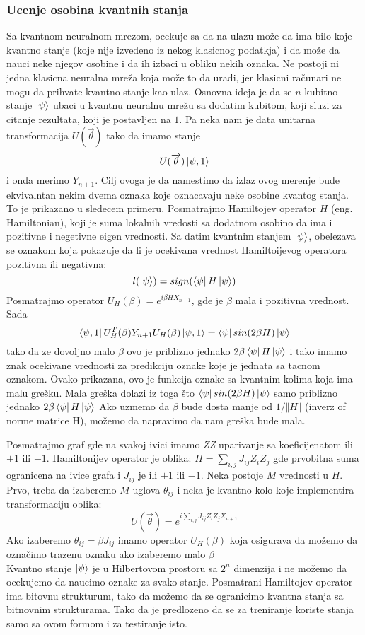 \documentclass[12pt, letterpaper, oneside]{article}
\begin{document}
\subsubsection{Ucenje osobina kvantnih stanja}
Sa kvantnom neuralnom mrezom, ocekuje sa da na ulazu može da ima bilo koje kvantno stanje (koje nije izvedeno iz nekog klasicnog podatkja)
i da može da nauci neke njegov osobine i da ih izbaci u obliku nekih oznaka. Ne postoji ni jedna klasicna neuralna mreža koja može to da uradi, jer klasicni računari ne mogu da prihvate kvantno stanje kao ulaz.
Osnovna ideja je da se $n$-kubitno stanje $\Ket{\psi}$ ubaci u kvantnu neuralnu mrežu sa dodatim kubitom, koji sluzi za citanje rezultata, koji je postavljen na $1$.
Pa neka nam je data unitarna transformacija $U(\overrightarrow{\theta})$ tako da imamo stanje
\[
    U(\overrightarrow{\theta})\Ket{\psi,1}
\] 
i onda merimo $Y_{n+1}$. Cilj ovoga je da namestimo da izlaz ovog merenje bude ekvivalntan nekim dvema oznaka koje oznacavaju neke osobine kvantog stanja.
To je prikazano u sledecem primeru.
Posmatrajmo Hamiltojev operator $H$ (eng. Hamiltonian), koji je suma lokalnih vredosti sa dodatnom osobino da ima i pozitivne i negetivne eigen vrednosti.
Sa datim kvantnim stanjem $\ket{\psi}$, obelezava se oznakom koja pokazuje da li je ocekivana vrednost Hamiltoijevog operatora pozitivna ili negativna:
\[
    l(\Ket{\psi}) = sign(\bra{\psi}H\Ket{\psi})
\]
Posmatrajmo operator $U_H(\beta) = e^{i\beta HX_{n+1}}$, gde je $\beta$ mala i pozitivna vrednost. Sada
\[
    \Bra{\psi,1}U_H^T(\beta)Y_{n+1}U_H(\beta)\Ket{\psi,1} = \bra{\psi}sin(2\beta H)\Ket{\psi}
\]
tako da ze dovoljno malo $\beta$ ovo je priblizno jednako $2\beta\bra{\psi}H\Ket{\psi}$ i tako imamo znak ocekivane vrednosti za 
predikciju oznake koje je jednata sa tacnom oznakom. Ovako prikazana, ovo je funkcija oznake sa kvantnim kolima koja
ima malu grešku. Mala greška dolazi iz toga što $\bra{\psi}sin(2\beta H)\Ket{\psi}$ samo priblizno jednako $2\beta\bra{\psi}H\Ket{\psi}$
Ako uzmemo da $\beta$ bude dosta manje od $1/\Vert H \Vert$ (inverz of norme matrice H), možemo da napravimo da nam greška bude mala.

Posmatrajmo graf gde na svakoj ivici imamo \textit{ZZ} uparivanje sa koeficijenatom ili $+1$ ili $-1$.
Hamiltonijev operator je oblika: $H = \sum_{i,j}J_{ij}Z_iZ_j$ gde prvobitna suma ogranicena na ivice grafa i $J_{ij}$ je ili $+1$ ili $-1$.
Neka postoje $M$ vrednosti u $H$. Prvo, treba da izaberemo $M$ uglova $\theta_{ij}$ i neka je kvantno kolo koje implementira transformaciju oblika:
\[
    U(\overrightarrow{\theta}) = e^{i\sum_{i,j}J_{ij}Z_iZ_jX_{n+1}}
\]
Ako izaberemo $\theta_{ij}=\beta J_{ij}$ imamo operator $U_H(\beta)$ koja osigurava da možemo da označimo trazenu oznaku
ako izaberemo malo $\beta$ \\
Kvantno stanje $\Ket{\psi}$ je u Hilbertovom prostoru sa $2^n$ dimenzija i ne možemo da ocekujemo da naucimo oznake za svako stanje.
Posmatrani Hamiltojev operator ima bitovnu strukturum, tako da možemo da se ogranicimo kvantna stanja sa bitnovnim strukturama.
Tako da je predlozeno da se za treniranje koriste stanja samo sa ovom formom i za testiranje isto.
\end{document}
